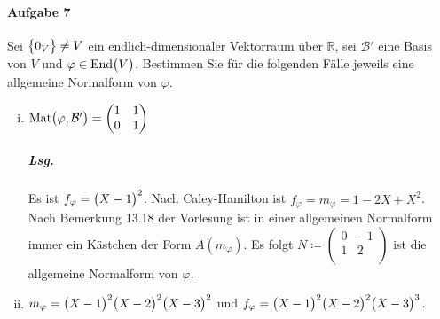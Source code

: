 \documentclass{scrreprt}
\newcommand{\End}{\text{End}}
\newcommand{\Mat}{\text{Mat}}
\begin{document}
\paragraph{Aufgabe 7} Sei $\qty\big{0_V} \ne V$ ein endlich-dimensionaler
Vektorraum über $\mathbb{R}$, sei $\mathcal{B}'$ eine Basis von $V$ und
$\varphi \in \End\qty\big(V)$.
Bestimmen Sie für die folgenden Fälle jeweils eine allgemeine Normalform von
$\varphi$.
\begin{enumerate}[(i)]
\item $\Mat\qty\big(\varphi, \mathcal{B}') = \begin{pmatrix}
    1 & 1 \\
    0 & 1 \\
  \end{pmatrix}$

  \subparagraph{Lsg.} Es ist $f_{\varphi} = \qty\big(X - 1)^2$.
  Nach Caley-Hamilton ist $f_{\varphi} = m_{\varphi} = 1 -2X + X^2$.
  Nach Bemerkung 13.18 der Vorlesung ist in einer allgemeinen Normalform
  immer ein Kästchen der Form $A(m_{\varphi})$.
  Es folgt $N \coloneqq \begin{pmatrix}
    0 & -1 \\
    1 & 2 \\
  \end{pmatrix}$ ist die allgemeine Normalform von $\varphi$.

\item $m_{\varphi} = \qty\big(X - 1)^2 \qty\big(X - 2)^2\qty\big(X - 3)^2$ und
  $f_{\varphi} = \qty\big(X - 1)^2 \qty\big(X - 2)^2\qty\big(X - 3)^3$.


\end{enumerate}
\end{document}
